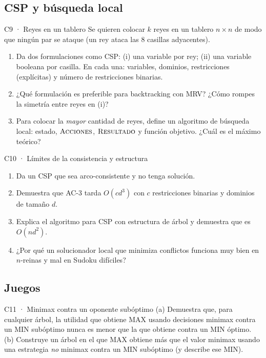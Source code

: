 \subsection{CSP y búsqueda local}

\begin{ejercicio}{C9 · Reyes en un tablero }
Se quieren colocar $k$ reyes en un tablero $n\times n$ de modo que ningún par se ataque (un rey
ataca las 8 casillas adyacentes).
\begin{enumerate}[label=(\alph*)]
\item Da dos formulaciones como CSP: (i) una variable por rey; (ii) una variable booleana por casilla.
En cada una: variables, dominios, restricciones (explícitas) y número de restricciones binarias.
\item ¿Qué formulación es preferible para backtracking con MRV? ¿Cómo rompes la simetría entre reyes en (i)?
\item Para colocar la \emph{mayor} cantidad de reyes, define un algoritmo de búsqueda local:
estado, $\textsc{Acciones}$, $\textsc{Resultado}$ y función objetivo. ¿Cuál es el máximo teórico?
\end{enumerate}
\end{ejercicio}

\begin{ejercicio}{C10 · Límites de la consistencia y estructura }
\begin{enumerate}[label=(\alph*)]
\item Da un CSP que sea arco-consistente y no tenga solución.
\item Demuestra que AC-3 tarda $O(cd^3)$ con $c$ restricciones binarias y dominios de tamaño $d$.
\item Explica el algoritmo para CSP con estructura de árbol y demuestra que es $O(nd^2)$.
\item ¿Por qué un solucionador local que minimiza conflictos funciona muy bien en $n$-reinas y mal
en Sudoku difíciles?
\end{enumerate}
\end{ejercicio}

\subsection{Juegos}

\begin{ejercicio}{C11 · Minimax contra un oponente subóptimo }
(a) Demuestra que, para cualquier árbol, la utilidad que obtiene MAX usando decisiones minimax contra
un MIN subóptimo nunca es menor que la que obtiene contra un MIN óptimo.
(b) Construye un árbol en el que MAX obtiene más que el valor minimax usando una estrategia
\emph{no} minimax contra un MIN subóptimo (y describe ese MIN).
\end{ejercicio}

